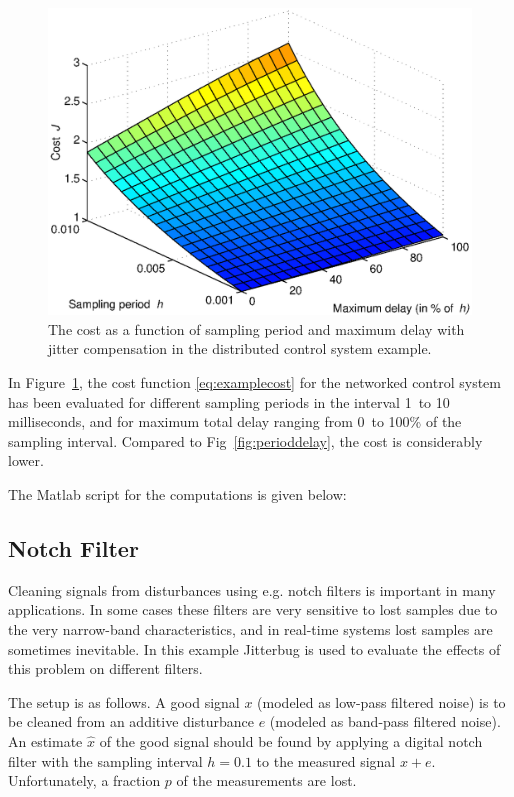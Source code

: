 \documentclass[final,twoside]{rapport}  %
\begin{document}
\begin{figure}[tbp]
\center
\includegraphics[width=0.75\hsize]{case6.eps}
\caption{The cost as a function of sampling period and maximum delay
  with jitter compensation in the distributed control system example.}
\label{fig:periodjitter}
\end{figure}

In Figure~\ref{fig:periodjitter}, the cost function
\eqref{eq:examplecost} for the networked control system has been
evaluated for different sampling periods in the interval 1~to 10
milliseconds, and for maximum total delay ranging from 0~to 100\% of
the sampling interval. Compared to Fig~\ref{fig:perioddelay}, the cost
is considerably lower.

The Matlab script for the computations is given below:
\begin{small}

\end{small}

\subsection{Notch Filter}

Cleaning signals from disturbances using e.g. notch filters is
important in many applications. In some cases these filters are very
sensitive to lost samples due to the very narrow-band characteristics,
and in real-time systems lost samples are sometimes inevitable. In
this example {\sc Jitterbug} is used to evaluate the effects of this
problem on different filters.

The setup is as follows. A good signal $x$ (modeled as low-pass
filtered noise) is to be cleaned from an additive disturbance $e$
(modeled as band-pass filtered noise). 
An estimate $\hat x$ of the good signal should be
found by applying a digital notch filter with the sampling interval
$h=0.1$ to the measured signal $x+e$. Unfortunately, a fraction $p$ of
the measurements are lost.
\end{document}
